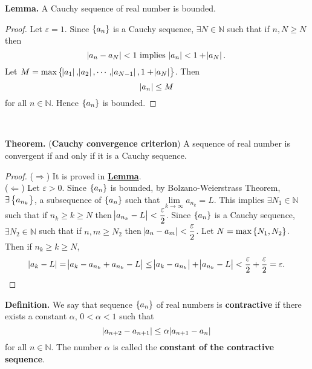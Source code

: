 \documentclass[12pt,a4paper]{article}
\newcommand{\dispsty}{\displaystyle}
\begin{document}
\begin{tcolorbox}[colback=white]
	\textbf{Lemma.} A Cauchy sequence of real number is bounded.
	\tcblower\begin{proof}
		Let $\varepsilon=1$. Since $\set{a_n}$ is a Cauchy sequence, $\exists N\in\mathbb{N}$ such that if $n,N\geq N$ then \[
		\abs{a_n-a_N}<1\ \text{implies}\ \abs{a_n}<1+\abs{a_N}.
		\] Let $M=\max\set{\abs{a_1},\abs{a_2},\cdots,\abs{a_{N-1}},1+\abs{a_N} }$. Then \[
		\abs{a_n}\leq M
		\] for all $n\in\mathbb{N}$. Hence $\set{a_n}$ is bounded.
	\end{proof}
\end{tcolorbox}
\
\begin{tcolorbox}[colback=white]
	\textbf{Theorem.} (\textbf{Cauchy convergence criterion}) A sequence of real number is convergent if and only if it is a Cauchy sequence.\tcblower\begin{proof}
		($\Rightarrow$) It is proved in \hyperlink{cauchyLemma}{\bf Lemma}.\\
		($\Leftarrow$) Let $\varepsilon>0$. Since $\set{a_n}$ is bounded, by Bolzano-Weierstrass Theorem, $\exists\set{a_{n_k}}$, a subsequence of $\set{a_n}$ such that $\lim\limits_{k\to\infty}a_{n_k}=L$. This implies $\exists N_1\in\mathbb{N}$ such that if $n_k\geq k\geq N$ then $\abs{a_{n_k}-L}<\dispsty\frac{\varepsilon}{2}$. Since $\set{a_n}$ is a Cauchy sequence, $\exists N_2\in\mathbb{N}$ such that if $n,m\geq N_2$ then $\abs{a_n-a_m}<\dispsty\frac{\varepsilon}{2}$. Let $N=\max\set{N_1,N_2}$. Then if $n_k\geq k\geq N$, \[
		\abs{a_k-L}=\abs{a_k-a_{n_k}+a_{n_k}-L}\leq\abs{a_k-a_{n_k}}+\abs{a_{n_k}-L}<\frac{\varepsilon}{2}+\frac{\varepsilon}{2}=\varepsilon.
		\]
	\end{proof}
\end{tcolorbox}
\newpage
\begin{tcolorbox}[colback=white]
	\textbf{Definition.} We say that sequence $\set{a_n}$ of real numbers is \textbf{contractive} if there exists a constant $\alpha$, $0<\alpha<1$ such that \[
	\abs{a_{n+2}-a_{n+1}}\leq\alpha\abs{a_{n+1}-a_n}
	\] for all $n\in\mathbb{N}$. The number $\alpha$ is called the \textbf{constant of the contractive sequence}.
\end{tcolorbox}
\end{document}
